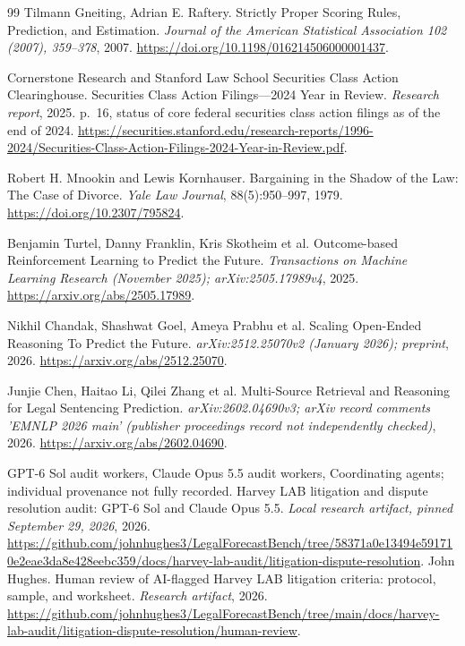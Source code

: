 \documentclass[11pt]{article}
\begin{document}
\begin{thebibliography}{99}
 Tilmann Gneiting, Adrian E. Raftery. Strictly Proper Scoring Rules, Prediction, and Estimation. \emph{Journal of the American Statistical Association 102 (2007), 359--378}, 2007. \url{https://doi.org/10.1198/016214506000001437}.

 Cornerstone Research and Stanford Law School Securities Class Action Clearinghouse. Securities Class Action Filings---2024 Year in Review. \emph{Research report}, 2025. p.~16, status of core federal securities class action filings as of the end of 2024. \url{https://securities.stanford.edu/research-reports/1996-2024/Securities-Class-Action-Filings-2024-Year-in-Review.pdf}.

 Robert H. Mnookin and Lewis Kornhauser. Bargaining in the Shadow of the Law: The Case of Divorce. \emph{Yale Law Journal}, 88(5):950--997, 1979. \url{https://doi.org/10.2307/795824}.

 Benjamin Turtel, Danny Franklin, Kris Skotheim et al. Outcome-based Reinforcement Learning to Predict the Future. \emph{Transactions on Machine Learning Research (November 2025); arXiv:2505.17989v4}, 2025. \url{https://arxiv.org/abs/2505.17989}.

 Nikhil Chandak, Shashwat Goel, Ameya Prabhu et al. Scaling Open-Ended Reasoning To Predict the Future. \emph{arXiv:2512.25070v2 (January 2026); preprint}, 2026. \url{https://arxiv.org/abs/2512.25070}.

 Junjie Chen, Haitao Li, Qilei Zhang et al. Multi-Source Retrieval and Reasoning for Legal Sentencing Prediction. \emph{arXiv:2602.04690v3; arXiv record comments 'EMNLP 2026 main' (publisher proceedings record not independently checked)}, 2026. \url{https://arxiv.org/abs/2602.04690}.

 GPT-6 Sol audit workers, Claude Opus 5.5 audit workers, Coordinating agents; individual provenance not fully recorded. Harvey LAB litigation and dispute resolution audit: GPT-6 Sol and Claude Opus 5.5. \emph{Local research artifact, pinned September 29, 2026}, 2026. \url{https://github.com/johnhughes3/LegalForecastBench/tree/58371a0e13494e591710e2eae3da8e428eebc359/docs/harvey-lab-audit/litigation-dispute-resolution}.
 John Hughes. Human review of AI-flagged Harvey LAB litigation criteria: protocol, sample, and worksheet. \emph{Research artifact}, 2026. \url{https://github.com/johnhughes3/LegalForecastBench/tree/main/docs/harvey-lab-audit/litigation-dispute-resolution/human-review}.


\end{thebibliography}
\end{document}
